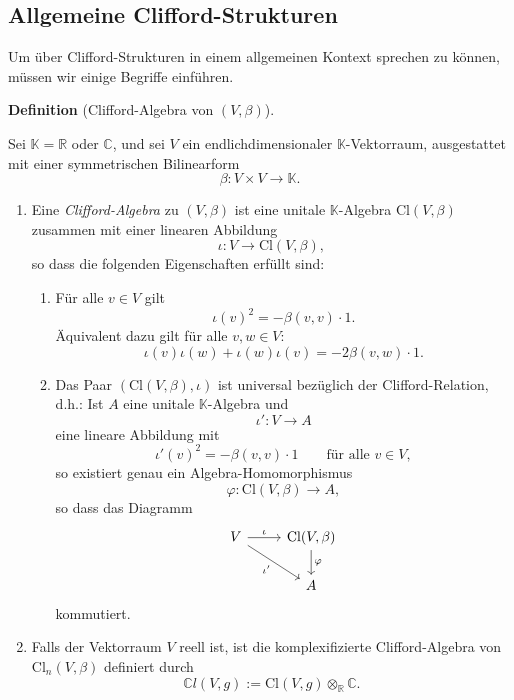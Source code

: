 \documentclass[10pt, letterpaper]{article}
\newcommand{\R}{\mathbb{R}}
\newcommand{\C}{\mathbb{C}}
\newcommand{\Cl}{\mathrm{Cl}}
\newcommand{\CustomHeading}[3]{%
  \par\medskip\noindent%
  \textbf{#1 #2} \textnormal{(#3)}.\enskip%
}
\newenvironment{DEF}[2]{\CustomHeading{Definition}{#1}{#2}}{}
\begin{document}
\subsection{Allgemeine Clifford-Strukturen}

Um über Clifford-Strukturen in einem allgemeinen Kontext sprechen zu können, müssen wir einige Begriffe einführen.

\begin{DEF}{}{Clifford-Algebra von \((V,\beta)\)}
Sei \(\mathbb{K}=\mathbb{R}\) oder \(\mathbb{C}\), und sei \(V\) ein endlichdimensionaler \(\mathbb{K}\)-Vektorraum, ausgestattet mit einer symmetrischen Bilinearform
\[
\beta:V\times V\to \mathbb{K}.
\]

\begin{enumerate}
\item Eine \emph{Clifford-Algebra} zu \((V,\beta)\) ist eine unitale \(\mathbb{K}\)-Algebra
\(\Cl(V,\beta)\) zusammen mit einer linearen Abbildung
\[
\iota:V\to \Cl(V,\beta),
\]
so dass die folgenden Eigenschaften erfüllt sind:

\begin{enumerate}
    \item Für alle \(v\in V\) gilt
    \[
    \iota(v)^2=-\beta(v,v)\cdot 1.
    \]
    Äquivalent dazu gilt für alle \(v,w\in V\):
    \[
    \iota(v)\iota(w)+\iota(w)\iota(v)=-2\beta(v,w)\cdot 1.
    \]

    \item Das Paar \((\Cl(V,\beta),\iota)\) ist universal bezüglich der Clifford-Relation, d.h.:
    Ist \(A\) eine unitale \(\mathbb{K}\)-Algebra und
    \[
    \iota':V\to A
    \]
    eine lineare Abbildung mit
    \[
    \iota'(v)^2=-\beta(v,v)\cdot 1
    \qquad\text{für alle }v\in V,
    \]
    so existiert genau ein Algebra-Homomorphismus
    \[
    \varphi:\Cl(V,\beta)\to A,
    \]
    so dass das Diagramm
    \[
    \begin{tikzcd}
    V \arrow[r, "\iota"] \arrow[dr, "\iota'"'] & \Cl(V,\beta) \arrow[d, "\varphi"] \\
    & A
    \end{tikzcd}
    \]
    kommutiert.
\end{enumerate}

\item Falls der Vektorraum $V$ reell ist, ist die komplexifizierte Clifford-Algebra von $\Cl_n(V,\beta)$ definiert durch 
  \[
  \C l(V,g):=\Cl(V,g)\otimes_{\R}\C.
  \]
\end{enumerate}
\end{DEF}
\end{document}
